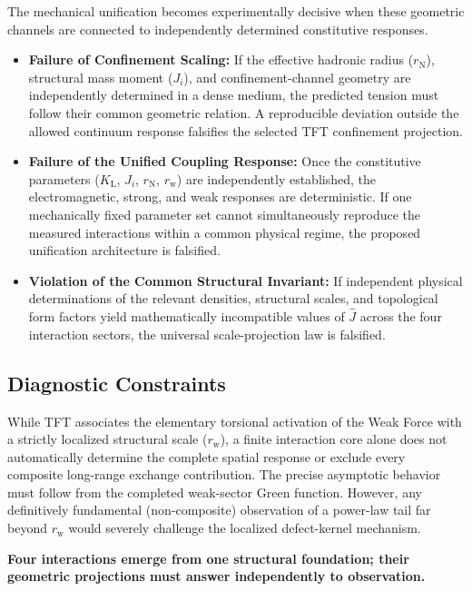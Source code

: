 The mechanical unification becomes experimentally decisive when these geometric channels are connected to independently determined constitutive responses. 

\begin{itemize}
    \item \textbf{Failure of Confinement Scaling:} If the effective hadronic radius ($r_{\mathrm N}$), structural mass moment ($J_i$), and confinement-channel geometry are independently determined in a dense medium, the predicted tension must follow their common geometric relation. A reproducible deviation outside the allowed continuum response falsifies the selected TFT confinement projection.

    \item \textbf{Failure of the Unified Coupling Response:} Once the constitutive parameters ($K_{\mathrm L}$, $J_i$, $r_{\mathrm N}$, $r_{\mathrm w}$) are independently established, the electromagnetic, strong, and weak responses are deterministic. If one mechanically fixed parameter set cannot simultaneously reproduce the measured interactions within a common physical regime, the proposed unification architecture is falsified.

    \item \textbf{Violation of the Common Structural Invariant:} If independent physical determinations of the relevant densities, structural scales, and topological form factors yield mathematically incompatible values of $\hat{J}$ across the four interaction sectors, the universal scale-projection law is falsified.
\end{itemize}

\subsection*{Diagnostic Constraints}

While TFT associates the elementary torsional activation of the Weak Force with a strictly localized structural scale ($r_{\mathrm w}$), a finite interaction core alone does not automatically determine the complete spatial response or exclude every composite long-range exchange contribution. The precise asymptotic behavior must follow from the completed weak-sector Green function. However, any definitively fundamental (non-composite) observation of a power-law tail far beyond $r_{\mathrm w}$ would severely challenge the localized defect-kernel mechanism.

\medskip
\noindent\textbf{Four interactions emerge from one structural foundation; their geometric projections must answer independently to observation.}


